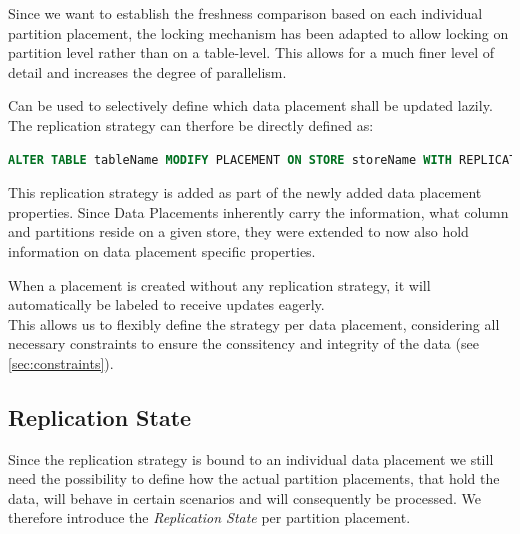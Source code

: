 
Since we want to establish the freshness comparison based on each individual partition placement, the locking mechanism
has been adapted to allow locking on partition level rather than on a table-level. 
This allows for a much finer level of detail and increases the degree of parallelism. 

Can be used to selectively define which data placement shall be updated lazily.
The replication strategy can therfore be directly defined as:
\begin{lstlisting}[language=sql]
    ALTER TABLE tableName MODIFY PLACEMENT ON STORE storeName WITH REPLICATION ( LAZY | EAGER );
\end{lstlisting}

This replication strategy is added as part of the newly added data placement properties. Since Data Placements inherently carry the information, what column and partitions reside
on a given store, they were extended to now also hold information on data placement specific properties.

When a placement is created without any replication strategy, it will automatically be labeled to receive updates eagerly.\\
This allows us to flexibly define the strategy per data placement, considering all necessary constraints to ensure the conssitency and integrity of the data (see \ref{sec:constraints}).




\subsection{Replication State}
\label{sec:states}

Since the replication strategy is bound to an individual data placement we still need the possibility to 
define how the actual partition placements, that hold the data, will behave in certain scenarios and will consequently be processed.
We therefore introduce the \emph{Replication State} per partition placement.\\

